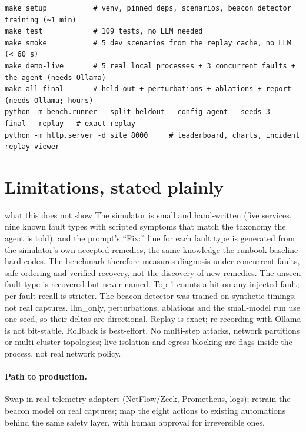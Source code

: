 \documentclass[11pt,a4paper]{article}
\begin{document}
\begin{tcolorbox}[enhanced,colback=keyfill,colframe=accent!60,boxrule=0.5pt,arc=2pt,left=6pt,right=6pt]
\scriptsize\begin{verbatim}
make setup           # venv, pinned deps, scenarios, beacon detector training (~1 min)
make test            # 109 tests, no LLM needed
make smoke           # 5 dev scenarios from the replay cache, no LLM (< 60 s)
make demo-live       # 5 real local processes + 3 concurrent faults + the agent (needs Ollama)
make all-final       # held-out + perturbations + ablations + report (needs Ollama; hours)
python -m bench.runner --split heldout --config agent --seeds 3 --final --replay   # exact replay
python -m http.server -d site 8000     # leaderboard, charts, incident replay viewer
\end{verbatim}
\end{tcolorbox}

\section{Limitations, stated plainly}

\begin{limitation}{what this does not show}
The simulator is small and hand-written (five services, nine known fault types with scripted
symptoms that match the taxonomy the agent is told), and the prompt's ``Fix:'' line for each
fault type is generated from the simulator's own accepted remedies, the same knowledge the
runbook baseline hard-codes. The benchmark therefore measures diagnosis under concurrent faults,
safe ordering and verified recovery, not the discovery of new remedies. The unseen fault type is
recovered but never named. Top-1 counts a hit on any injected fault; per-fault recall is stricter. The beacon detector was trained on synthetic timings, not real captures. llm\_only,
perturbations, ablations and the small-model run use one seed, so their deltas are directional. Replay is exact; re-recording with Ollama is not bit-stable. Rollback is best-effort.
No multi-step attacks, network partitions or multi-cluster topologies; live isolation and egress
blocking are flags inside the process, not real network policy.
\end{limitation}

\paragraph{Path to production.} Swap in real telemetry adapters (NetFlow/Zeek, Prometheus, logs);
retrain the beacon model on real captures; map the eight actions to existing automations behind the
same safety layer, with human approval for irreversible ones.
\end{document}
